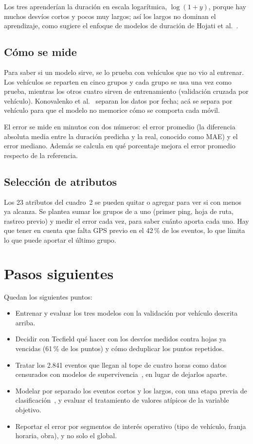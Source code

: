 \documentclass[11pt,a4paper]{article}
\begin{document}
Los tres aprenderían la duración en escala logarítmica, $\log(1+y)$, porque hay muchos desvíos cortos
y pocos muy largos; así los largos no dominan el aprendizaje, como sugiere el enfoque de modelos de
duración de Hojati et al.~\cite{hojati}.

\subsection{Cómo se mide}

Para saber si un modelo sirve, se lo prueba con vehículos que no vio al entrenar. Los vehículos se
reparten en cinco grupos y cada grupo se usa una vez como prueba, mientras los otros cuatro sirven de
entrenamiento (validación cruzada por vehículo). Konovalenko et al.~\cite{konovalenko} separan los datos
por fecha; acá se separa por vehículo para que el modelo no memorice cómo se comporta cada móvil.

El error se mide en minutos con dos números: el error promedio (la diferencia absoluta media entre la
duración predicha y la real, conocido como MAE) y el error mediano. Además se calcula en qué porcentaje
mejora el error promedio respecto de la referencia.

\subsection{Selección de atributos}

Los 23 atributos del cuadro~2 se pueden quitar o agregar para ver si con menos ya alcanza. Se plantea
sumar los grupos de a uno (primer ping, hoja de ruta, rastreo previo) y medir el error cada vez, para
saber cuánto aporta cada uno. Hay que tener en cuenta que falta GPS previo en el 42\,\% de los
eventos, lo que limita lo que puede aportar el último grupo.

\section{Pasos siguientes}

Quedan los siguientes puntos:

\begin{itemize}[nosep]
  \item Entrenar y evaluar los tres modelos con la validación por vehículo descrita arriba.
  \item Decidir con Tecfield qué hacer con los desvíos medidos contra hojas ya vencidas (61\,\% de los
  puntos) y cómo deduplicar los puntos repetidos.
  \item Tratar los 2.841 eventos que llegan al tope de cuatro horas como datos censurados con modelos
  de supervivencia~\cite{hojati}, en lugar de dejarlos aparte.
  \item Modelar por separado los eventos cortos y los largos, con una etapa previa de
  clasificación~\cite{grigorev}, y evaluar el tratamiento de valores atípicos de la variable
  objetivo.
  \item Reportar el error por segmentos de interés operativo (tipo de vehículo, franja horaria,
  obra), y no solo el global.
\end{itemize}
\end{document}

